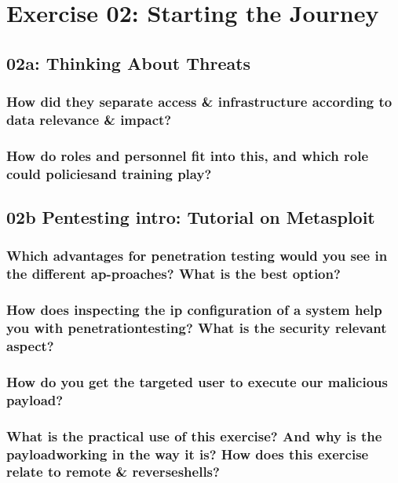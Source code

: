 \section{Exercise 02: Starting the Journey}

\subsection{02a: Thinking About Threats}

\subsubsection{How did they separate access \& infrastructure according to data relevance \& impact?}

\subsubsection{How do roles and personnel fit into this, and which role could policiesand training play?}

\subsection{02b Pentesting intro: Tutorial on Metasploit}

\subsubsection{Which advantages for penetration testing would you see in the different ap-proaches? What is the best option?}

\subsubsection{How does inspecting the ip configuration of a system help you with penetrationtesting? What is the security relevant aspect?}

\subsubsection{How do you get the targeted user to execute our malicious payload?}

\subsubsection{What is the practical use of this exercise? And why is the payloadworking in the way it is? How does this exercise relate to remote \& reverseshells?}
